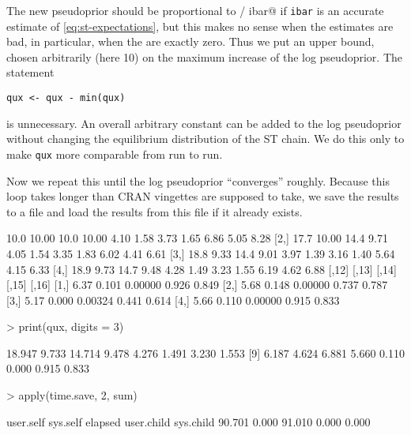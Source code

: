 \documentclass[11pt]{article}
\begin{document}
The new pseudoprior should be proportional to  / ibar@ if \texttt{ibar}
is an accurate estimate of \eqref{eq:st-expectations}, but this makes no sense
when the estimates are bad, in particular, when the are exactly zero.  Thus
we put an upper bound, chosen arbitrarily (here 10) on the maximum increase
of the log pseudoprior.  The statement
\begin{verbatim}
qux <- qux - min(qux)
\end{verbatim}
is unnecessary.  An overall arbitrary constant can be added to
the log pseudoprior without changing the equilibrium distribution of the
ST chain.
We do this only to make \texttt{qux} more comparable from
run to run.

Now we repeat this until the log pseudoprior ``converges'' roughly.
Because this loop takes longer than CRAN vingettes are supposed to
take, we save the results to a file
and load the results from this file if it already exists.
\begin{Schunk}
\begin{Soutput}
     [,1]  [,2] [,3]  [,4] [,5] [,6] [,7] [,8] [,9] [,10] [,11]
[1,] 10.0 10.00 10.0 10.00 4.10 1.58 3.73 1.65 6.86  5.05  8.28
[2,] 17.7 10.00 14.4  9.71 4.05 1.54 3.35 1.83 6.02  4.41  6.61
[3,] 18.8  9.33 14.4  9.01 3.97 1.39 3.16 1.40 5.64  4.15  6.33
[4,] 18.9  9.73 14.7  9.48 4.28 1.49 3.23 1.55 6.19  4.62  6.88
     [,12] [,13]   [,14] [,15] [,16]
[1,]  6.37 0.101 0.00000 0.926 0.849
[2,]  5.68 0.148 0.00000 0.737 0.787
[3,]  5.17 0.000 0.00324 0.441 0.614
[4,]  5.66 0.110 0.00000 0.915 0.833
\end{Soutput}
\begin{Sinput}
> print(qux, digits = 3)
\end{Sinput}
\begin{Soutput}
 [1] 18.947  9.733 14.714  9.478  4.276  1.491  3.230  1.553
 [9]  6.187  4.624  6.881  5.660  0.110  0.000  0.915  0.833
\end{Soutput}
\begin{Sinput}
> apply(time.save, 2, sum)
\end{Sinput}
\begin{Soutput}
 user.self   sys.self    elapsed user.child  sys.child 
    90.701      0.000     91.010      0.000      0.000 
\end{Soutput}
\end{Schunk}
\end{document}
